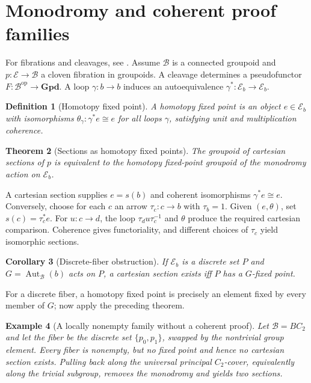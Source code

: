 \documentclass[12pt,a4paper,twoside]{extarticle}
\makeatletter
\theoremstyle{compactplain}
\newtheorem{theorem}{Theorem}[section]
\newtheorem{corollary}[theorem]{Corollary}
\theoremstyle{compactdef}
\newtheorem{definition}[theorem]{Definition}
\newtheorem{example}[theorem]{Example}
\renewenvironment{proof}[1][\proofname]{\par\pushQED{\qed}\normalfont
  \topsep2pt\trivlist\item[\hskip\labelsep\bfseries #1\@addpunct{.}]\ignorespaces}
 {\popQED\endtrivlist\@endpefalse}
\newcommand{\Aut}{\operatorname{Aut}}
\newcommand{\iso}{\cong}
\makeatother
\begin{document}
\section{Monodromy and coherent proof families}
For fibrations and cleavages, see \cite{streicher,maclane}.
Assume $\mathcal B$ is a connected groupoid and $p:\mathcal E\to\mathcal B$ a cloven fibration in groupoids. A cleavage determines a pseudofunctor $F:\mathcal B^{\mathrm{op}}\to\mathbf{Gpd}$. A loop $\gamma:b\to b$ induces an autoequivalence $\gamma^*:\mathcal E_b\to\mathcal E_b$.

\begin{definition}[Homotopy fixed point]
A homotopy fixed point is an object $e\in\mathcal E_b$ with isomorphisms $\theta_\gamma:\gamma^*e\iso e$ for all loops $\gamma$, satisfying unit and multiplication coherence.
\end{definition}

\begin{theorem}[Sections as homotopy fixed points]
The groupoid of cartesian sections of $p$ is equivalent to the homotopy fixed-point groupoid of the monodromy action on $\mathcal E_b$.
\end{theorem}
\begin{proof}
A cartesian section supplies $e=s(b)$ and coherent isomorphisms $\gamma^*e\iso e$. Conversely, choose for each $c$ an arrow $\tau_c:c\to b$ with $\tau_b=1$. Given $(e,\theta)$, set $s(c)=\tau_c^*e$. For $u:c\to d$, the loop $\tau_du\tau_c^{-1}$ and $\theta$ produce the required cartesian comparison. Coherence gives functoriality, and different choices of $\tau_c$ yield isomorphic sections.
\end{proof}

\begin{corollary}[Discrete-fiber obstruction]
If $\mathcal E_b$ is a discrete set $P$ and $G=\Aut_{\mathcal B}(b)$ acts on $P$, a cartesian section exists iff $P$ has a $G$-fixed point.
\end{corollary}
\begin{proof}
For a discrete fiber, a homotopy fixed point is precisely an element fixed by every member of $G$; now apply the preceding theorem.
\end{proof}

\begin{example}[A locally nonempty family without a coherent proof]
Let $\mathcal B=BC_2$ and let the fiber be the discrete set $\{p_0,p_1\}$, swapped by the nontrivial group element. Every fiber is nonempty, but no fixed point and hence no cartesian section exists. Pulling back along the universal principal $C_2$-cover, equivalently along the trivial subgroup, removes the monodromy and yields two sections.
\end{example}
\end{document}
